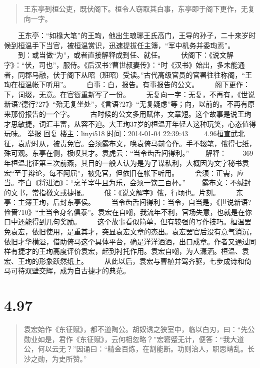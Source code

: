 \documentclass[]{book}
\begin{document}
\begin{quote}
王东亭到桓公吏，既伏阁下。桓令人窃取其白事，东亭即于阁下更作，无复向一字。
\end{quote}

　　王东亭：``如椽大笔''的王珣，他出生琅琊王氏高门，王导的孙子，二十来岁时候到桓温手下当官，被桓温赏识，迅速提拔任主簿，``军中机务并委珣焉''。
　　到：或当做``为''，或者直接解释成到任、就任。
　　伏阁下：《说文解字》：``伏，司也''，服侍。《后汉书?曹世叔妻传》：``时《汉书》始出，多未能通者，同郡马融，伏于阁下从昭（班昭）受读。''古代高级官员的官署往往称阁，``王珣在桓温帐下听用''。
　　白事：白，报告。有事报告的公文。
　　阁下更作：下，词缀，无意。在官衙重新写了一份。
　　无复向一字：无复，不再有，《世说新语?德行?27》``殆无复坐处''，《言语?27》``无复疑虑''等；向，以前的。不再有原来那份报告的一个字。
　　古时候的公文多用赋体，文章短。这个故事是说王珣才思敏捷，词汇丰富，从容不迫。大王珣37岁的桓温开年轻人这种玩笑，心态值得玩味。
举报 回复 楼主：linyi518 时间：2014-01-04 22:39:43
　　4.96桓宣武北征，袁虎时从，被责免官。会须露布文，唤袁倚马前令作。手不辍笔，俄得七纸，殊可观。东亭在侧，极叹其才。袁虎云：``当令齿舌间得利。''
　　解释：
　　369年桓温北征第三次前燕，其目的一般人认为是为了谋私利，大概因为文字秘书袁宏``至于辩论，每不阿屈''，被免官，但依旧在帐下听用。
　　会须：正需，应当。李白《将进酒》：``烹羊宰牛且为乐，会须一饮三百杯。''
　　露布文：不缄封的文书，常指檄文或捷报。
　　俄：《说文解字》俄，行顷也。片刻。 　　东亭：主簿王珣，后封东亭侯。
　　当令齿舌间得利：当令，自当是，《世说新语?俭啬?10》``士当令身名俱泰''。袁宏在自嘲，我流年不利，官场失意，也就是在你口中还能得到几句奖励。
　　这个故事看似简单，但有较强的写作技巧。桓温罢免袁宏，依旧使用，是重其才，突显袁宏文章的杰出。袁宏罢官后没有意气消沉，依旧才华横溢，借助倚马这个具体平台，确是洋洋洒洒，出口成章。作者又通过同样有捷才的王珣高度评价袁宏，起到衬托作用。袁宏自嘲，为人潇洒。桓温、袁宏、王珣的形象跃然纸上。
　　从此以后，袁宏与曹植并驾齐驱，七步成诗和倚马可待双壁交辉，成为自古捷才的典范。

\section{4.97}\label{section-272}

\begin{quote}
袁宏始作《东征赋》，都不道陶公。胡奴诱之狭室中，临以白刃，曰：``先公勋业如是，君作《东征赋》，云何相忽略？''宏窘蹙无计，便答：``我大道公，何以云无？''因诵曰：``精金百炼，在割能断。功则治人，职思靖乱。长沙之勋，为史所赞。''
\end{quote}
\end{document}
